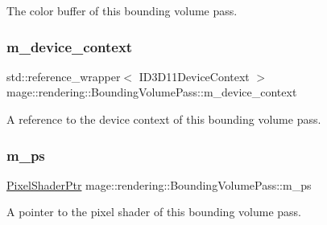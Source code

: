 The color buffer of this bounding volume pass. \hypertarget{classmage_1_1rendering_1_1_bounding_volume_pass_add230562e9ecd5454a7a2af73cd33f3f}{}\label{classmage_1_1rendering_1_1_bounding_volume_pass_add230562e9ecd5454a7a2af73cd33f3f} 
\subsubsection{\texorpdfstring{m\+\_\+device\+\_\+context}{m\_device\_context}}
{\footnotesize\ttfamily std\+::reference\+\_\+wrapper$<$ I\+D3\+D11\+Device\+Context $>$ mage\+::rendering\+::\+Bounding\+Volume\+Pass\+::m\+\_\+device\+\_\+context\hspace{0.3cm}{\ttfamily [private]}}

A reference to the device context of this bounding volume pass. \hypertarget{classmage_1_1rendering_1_1_bounding_volume_pass_a3faf9a381430a40cf6044ae91bd5d31d}{}\label{classmage_1_1rendering_1_1_bounding_volume_pass_a3faf9a381430a40cf6044ae91bd5d31d} 
\subsubsection{\texorpdfstring{m\+\_\+ps}{m\_ps}}
{\footnotesize\ttfamily \hyperlink{namespacemage_1_1rendering_af03d922b228ee9c8542baaa2ecc9f259}{Pixel\+Shader\+Ptr} mage\+::rendering\+::\+Bounding\+Volume\+Pass\+::m\+\_\+ps\hspace{0.3cm}{\ttfamily [private]}}

A pointer to the pixel shader of this bounding volume pass. \hypertarget{classmage_1_1rendering_1_1_bounding_volume_pass_a9e27e086186f11b111204323c162f9aa}{}\label{classmage_1_1rendering_1_1_bounding_volume_pass_a9e27e086186f11b111204323c162f9aa} 
